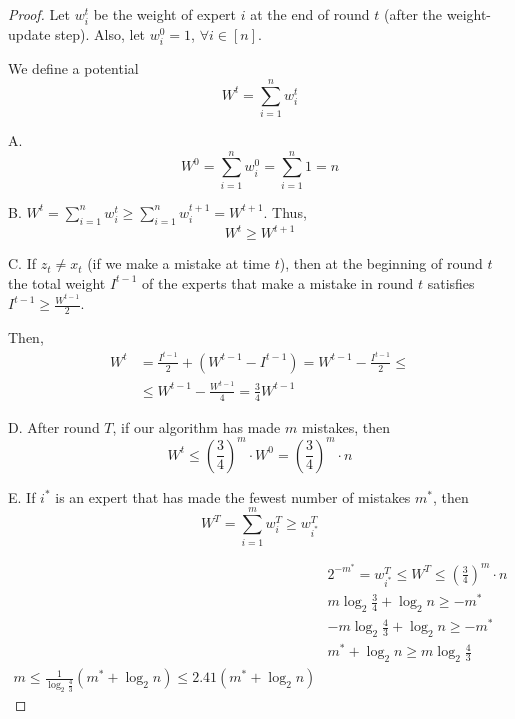    \begin{proof}
        Let $w_i^t$ be the weight of expert $i$ at the end of round $t$ (after the weight-update step).
        Also, let $w_i^0 = 1$, $\forall i \in [n]$.

        We define a potential
        \[ W^t = \sum_{i=1}^{n} w_i^t \]

        A.
        \[ W^0 = \sum_{i=1}^{n} w_i^0 = \sum_{i=1}^{n} 1 = n \]

        B. $W^t = \sum_{i=1}^{n} w_i^t \geq \sum_{i=1}^{n} w_i^{t+1} = W^{t+1}$.
        Thus,
        \[ W^t \geq W^{t+1} \]

        C. If $z_t \neq x_t$ (if we make a mistake at time $t$), then at the beginning of round $t$ the total weight $I^{t-1}$ of the experts that make a mistake in round $t$ satisfies $I^{t-1} \geq \frac{W^{t-1}}{2}$.

        Then,
        \begin{equation*}
            \begin{split}
                W^t &= \frac{I^{t-1}}{2} + (W^{t-1} - I^{t-1}) = W^{t-1} - \frac{I^{t-1}}{2} \leq\\
                    &\leq W^{t-1} - \frac{W^{t-1}}{4} = \frac{3}{4} W^{t-1}
            \end{split}
        \end{equation*}

        D. After round $T$, if our algorithm has made $m$ mistakes, then
        \[ W^t \leq \left( \frac{3}{4} \right)^m \cdot W^0 = \left( \frac{3}{4} \right)^m \cdot n \]

        E. If $i^*$ is an expert that has made the fewest number of mistakes $m^*$, then
        \[ W^T = \sum_{i=1}^{m} w_i^T \geq w_{i^*}^T \]

        \begin{equation*}
            \begin{split}
                &2^{-m^*} = w_{i^*}^T \leq W^T \leq \left( \frac{3}{4} \right)^m \cdot n\\
                &m \log_2 \frac{3}{4} + \log_2 n \geq -m^*\\
                &-m \log_2 \frac{4}{3} + \log_2 n \geq -m^*\\
                &m^* + \log_2 n \geq m \log_2 \frac{4}{3}\\
                m \leq \frac{1}{\log_2 \frac{4}{3}} (m^* + \log_2 n) \leq 2.41(m^* + \log_2 n)
            \end{split}
        \end{equation*}
    \end{proof}

